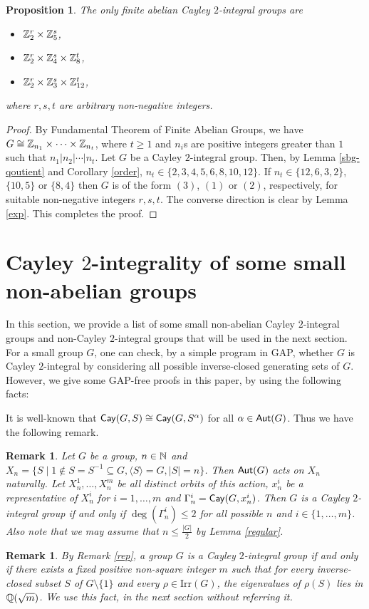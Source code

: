 \documentclass{amsart}
\newtheorem{pro}[thm]{Proposition}
\newtheorem{rem}[thm]{Remark}
\def \leq {\leqslant}
\def \geq {\geqslant}
\def\Aut{{\sf Aut}} \def\Inn{{\sf Inn}}\def\Core{{\sf Core}}
\def\Cay{{\sf Cay}} \def\Ker{{\sf Ker}}
\begin{document}
\begin{pro}\label{baseab}
The only finite abelian Cayley $2$-integral groups are 
\begin{itemize}
	\item[(1)] $\Bbb Z_2^r\times\Bbb Z_5^s$,
	\item[(2)] $\Bbb Z_2^r\times\Bbb Z_4^s\times \Bbb Z_8^t$,
	\item[(3)] $\Bbb Z_2^r\times\Bbb Z_3^s\times \Bbb Z_{12}^t$,
\end{itemize}
where $r,s,t$ are arbitrary non-negative integers.
\end{pro}
\begin{proof}
	By Fundamental Theorem of Finite Abelian Groups, we have $G\cong\Bbb Z_{n_1}\times\cdots\times\Bbb Z_{n_t}$, where $t\geq 1$ and $n_i$s are positive integers greater than $1$ such that $n_1|n_2|\cdots|n_t$.
	Let $G$ be a Cayley $2$-integral group. Then, by Lemma \ref{sbg-qoutient} and Corollary \ref{order}, $n_t\in\{2,3,4,5,6,8,10,12\}$. If $n_t\in\{12,6,3,2\}$, $\{10,5\}$ or $\{8,4\}$ then $G$ is of the form $(3)$, $(1)$ or $(2)$, respectively, for suitable non-negative integers $r,s,t$. The converse direction is clear by Lemma \ref{exp}. This completes the proof.
\end{proof}
\section{Cayley $2$-integrality of some small non-abelian groups}

In this section, we provide a list of some small non-abelian Cayley $2$-integral groups and  non-Cayley $2$-integral groups that will be used in the next section. For a small group $G$, one can check, by a simple program in GAP,  whether $G$ is Cayley $2$-integral by considering all possible inverse-closed generating sets of $G$. However, we give some GAP-free proofs in this paper, by using the following facts:

 It is well-known that $\Cay(G,S)\cong\Cay(G,S^\alpha)$ for all $\alpha\in\Aut(G)$. Thus we have the following remark.
\begin{rem}\label{orbit}
	Let $G$ be a group, $n\in\Bbb N$ and $X_n=\{S\mid 1\notin S=S^{-1}\subseteq G, \langle S\rangle=G,|S|=n\}$. Then $\Aut(G)$ acts on $X_n$ naturally. Let $X_n^{1},\ldots,X_n^{m}$ be all distinct orbits of this action, $x_n^{i}$ be a representative of $X_n^{i}$ for $i=1,\ldots,m$ and $\Gamma_n^i=\Cay(G,x_n^i)$. Then $G$ is a Cayley $2$-integral group if and only if $\deg(\Gamma_n^i)\leq 2$ for all possible $n$ and $i\in\{1,\ldots,m\}$. Also note that we may assume that $n\leq \frac{|G|}{2}$ by Lemma \ref{regular}.
\end{rem} 
\begin{rem}
	 By Remark \ref{rep}, a group $G$ is a Cayley $2$-integral group if and only if there exists a fixed positive non-square integer $m$ such that for every inverse-closed subset $S$ of $G\setminus \{1\}$ and every $\rho\in\textrm{Irr}(G)$, the eigenvalues of $\rho(S)$ lies in $\Bbb Q(\sqrt{m})$. We use this fact, in the next section without referring it.
\end{rem}
\end{document}
